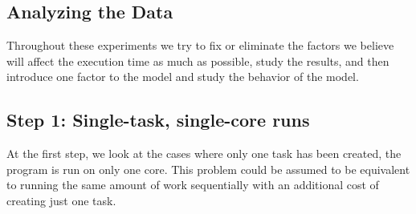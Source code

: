 \vspace{\baselineskip}
\subsection{Analyzing the Data}
Throughout these experiments we try to fix or eliminate the factors we believe will affect the execution time as much as possible, study the results, and then introduce one factor to the model and study the behavior of the model. 



\vspace{\baselineskip}
%

\subsection{Step 1: Single-task, single-core runs}
At the first step, we look at the cases where only one task has been created, the program is run on only one core. This problem could be assumed to be equivalent to running the same amount of work sequentially with an additional cost of creating just one task. 

\vspace{\baselineskip}
\vspace{\baselineskip}\vspace{\baselineskip}\vspace{\baselineskip}\vspace{\baselineskip}\vspace{\baselineskip}\vspace{\baselineskip}\vspace{\baselineskip}\vspace{\baselineskip}\vspace{\baselineskip}\vspace{\baselineskip}









